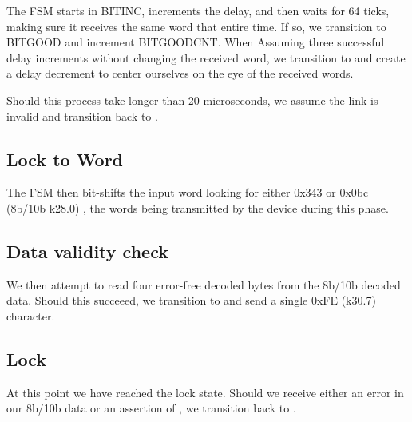 The FSM starts in BITINC, increments the delay, and then waits for 64
ticks, making sure it receives the same word that entire time. If so,
we transition to BITGOOD and increment BITGOODCNT. When Assuming three
successful delay increments without changing the received word, we
transition to  and create a delay decrement to center
ourselves on the eye of the received words.

Should this process take longer than 20 microseconds, we assume the
link is invalid and transition back to .

\subsection{Lock to Word}
The FSM then bit-shifts the input word looking for either 0x343 or
0x0bc (8b/10b k28.0) , the words being transmitted by the device
during this phase.

\subsection{Data validity check}

We then attempt to read four error-free decoded bytes from the 8b/10b
decoded data. Should this succeeed, we transition to 
and send a single 0xFE (k30.7) character.

\subsection{Lock}

At this point we have reached the lock state. Should we receive either
an error in our 8b/10b data or an assertion of , we
transition back to .
